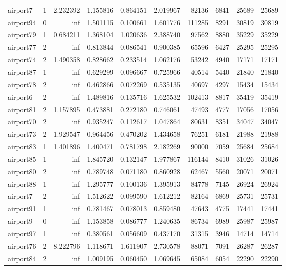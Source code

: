 \begin{longtable}{|l|r|r|r|r|r|r|r|r|r|}
airport7 & 1 & 2.232392 & 1.155816 & 0.864151 & 2.019967 & 82136 & 6841 & 25689 & 25689 \\
airport94 & 0 & inf & 1.501115 & 0.100661 & 1.601776 & 111285 & 8291 & 30819 & 30819 \\
airport79 & 1 & 0.684211 & 1.368104 & 1.020636 & 2.388740 & 97562 & 8880 & 35229 & 35229 \\
airport77 & 2 & inf & 0.813844 & 0.086541 & 0.900385 & 65596 & 6427 & 25295 & 25295 \\
airport74 & 2 & 1.490358 & 0.828662 & 0.233514 & 1.062176 & 53242 & 4940 & 17171 & 17171 \\
airport87 & 1 & inf & 0.629299 & 0.096667 & 0.725966 & 40514 & 5440 & 21840 & 21840 \\
airport78 & 2 & inf & 0.462866 & 0.072269 & 0.535135 & 40697 & 4297 & 15434 & 15434 \\
airport6 & 2 & inf & 1.489816 & 0.135716 & 1.625532 & 102413 & 8817 & 35419 & 35419 \\
airport81 & 2 & 1.157895 & 0.473881 & 0.272180 & 0.746061 & 47493 & 4777 & 17056 & 17056 \\
airport70 & 2 & inf & 0.935247 & 0.112617 & 1.047864 & 80631 & 8351 & 34047 & 34047 \\
airport73 & 2 & 1.929547 & 0.964456 & 0.470202 & 1.434658 & 76251 & 6181 & 21988 & 21988 \\
airport83 & 1 & 1.401896 & 1.400471 & 0.781798 & 2.182269 & 90000 & 7059 & 25684 & 25684 \\
airport85 & 1 & inf & 1.845720 & 0.132147 & 1.977867 & 116144 & 8410 & 31026 & 31026 \\
airport80 & 2 & inf & 0.789748 & 0.071180 & 0.860928 & 62467 & 5560 & 20071 & 20071 \\
airport88 & 1 & inf & 1.295777 & 0.100136 & 1.395913 & 84778 & 7145 & 26924 & 26924 \\
airport7 & 2 & inf & 1.512622 & 0.099590 & 1.612212 & 82164 & 6869 & 25731 & 25731 \\
airport91 & 1 & inf & 0.781467 & 0.078013 & 0.859480 & 47643 & 4775 & 17441 & 17441 \\
airport9 & 0 & inf & 1.153858 & 0.086777 & 1.240635 & 86734 & 6989 & 25987 & 25987 \\
airport97 & 1 & inf & 0.380561 & 0.056609 & 0.437170 & 31315 & 3946 & 14714 & 14714 \\
airport76 & 2 & 8.222796 & 1.118671 & 1.611907 & 2.730578 & 88071 & 7091 & 26287 & 26287 \\
airport84 & 2 & inf & 1.009195 & 0.060450 & 1.069645 & 65084 & 6054 & 22290 & 22290 \\

\end{longtable}
